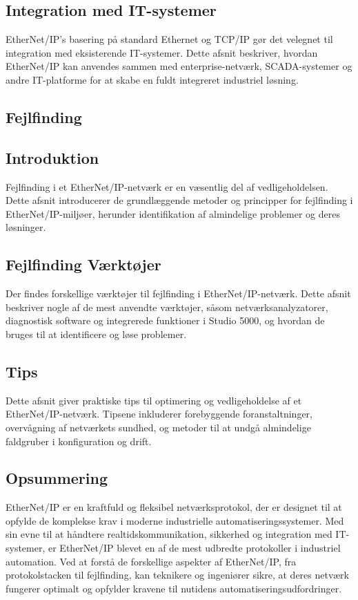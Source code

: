 \subsection*{Integration med IT-systemer}
EtherNet/IP's basering på standard Ethernet og TCP/IP gør det velegnet til integration med eksisterende IT-systemer. Dette afsnit beskriver, hvordan EtherNet/IP kan anvendes sammen med enterprise-netværk, SCADA-systemer og andre IT-platforme for at skabe en fuldt integreret industriel løsning.

\subsection{Fejlfinding}
\subsection*{Introduktion}
Fejlfinding i et EtherNet/IP-netværk er en væsentlig del af vedligeholdelsen. Dette afsnit introducerer de grundlæggende metoder og principper for fejlfinding i EtherNet/IP-miljøer, herunder identifikation af almindelige problemer og deres løsninger.

\subsection*{Fejlfinding Værktøjer}
Der findes forskellige værktøjer til fejlfinding i EtherNet/IP-netværk. Dette afsnit beskriver nogle af de mest anvendte værktøjer, såsom netværksanalyzatorer, diagnostisk software og integrerede funktioner i Studio 5000, og hvordan de bruges til at identificere og løse problemer.

\subsection*{Tips}
Dette afsnit giver praktiske tips til optimering og vedligeholdelse af et EtherNet/IP-netværk. Tipsene inkluderer forebyggende foranstaltninger, overvågning af netværkets sundhed, og metoder til at undgå almindelige faldgruber i konfiguration og drift.

\subsection{Opsummering}
EtherNet/IP er en kraftfuld og fleksibel netværksprotokol, der er designet til at opfylde de komplekse krav i moderne industrielle automatiseringssystemer. Med sin evne til at håndtere realtidskommunikation, sikkerhed og integration med IT-systemer, er EtherNet/IP blevet en af de mest udbredte protokoller i industriel automation. Ved at forstå de forskellige aspekter af EtherNet/IP, fra protokolstacken til fejlfinding, kan teknikere og ingeniører sikre, at deres netværk fungerer optimalt og opfylder kravene til nutidens automatiseringsudfordringer.

